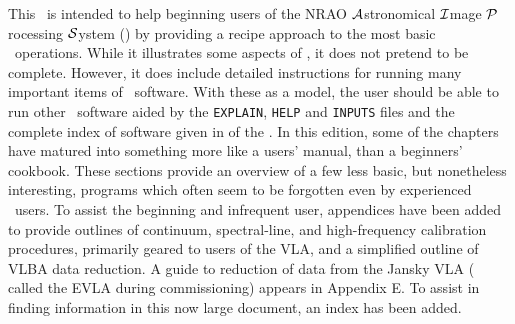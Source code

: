      This \COOKBOOK\ is intended to help beginning
users of the NRAO {$\cal A$}stronomical {$\cal I\/$}mage {$\cal
P\/$}rocessing {$\cal S\/$}ystem (\AIPS) by providing a recipe
approach to the most basic \AIPS\ operations.  While it illustrates
some aspects of \AIPS, it does not pretend to be complete.  However,
it does include detailed instructions for running many important items
of \AIPS\ software.  With these as a model, the user should be able to
run other \AIPS\ software aided by the {\tt EXPLAIN}, {\tt HELP} and
{\tt INPUTS} files and the complete index of software given in
 of the \COOKBOOK\@.  In this edition, some of the
chapters have matured into something more like a users' manual, than a
beginners' cookbook.  These sections provide an overview of a few less
basic, but nonetheless interesting, programs which often seem to be
forgotten even by experienced \AIPS\ users.  To assist the beginning
and infrequent user, appendices have been added to provide outlines of
continuum, spectral-line, and high-frequency calibration procedures,
primarily geared to users of the VLA, and a simplified outline of VLBA
data reduction.   A guide to reduction of data from the Jansky VLA (
called the EVLA during commissioning) appears in Appendix E\@.  To
assist in finding information in this now large document, an index has
been added.

